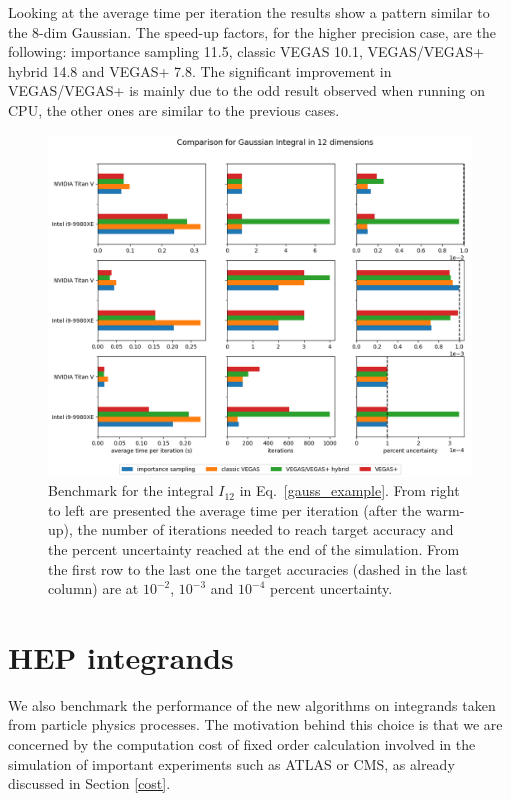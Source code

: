 \documentclass[../main/main.tex]{subfiles}
\begin{document}
Looking at the average time per iteration the results show a pattern similar to the 8-dim Gaussian. The speed-up factors, for the higher precision case, are the following: importance sampling 11.5, classic VEGAS 10.1, VEGAS/VEGAS+ hybrid 14.8 and VEGAS+ 7.8.
The significant improvement in VEGAS/VEGAS+ is mainly due to the odd result observed when running on CPU, the other ones are similar to the previous cases.

\begin{figure}
	\centering
	\includegraphics[width=\textwidth]{../images/gauss12d_final.png}
	\caption{Benchmark  for the integral $I_{12}$ in Eq.~\ref{gauss_example}. From right to left are presented the average time per iteration (after the warm-up), the number of iterations needed to reach target accuracy and the percent uncertainty reached at the end of the simulation. From the first row to the last one the target accuracies (dashed in the last column) are at $10^{-2}$, $10^{-3}$ and $10^{-4}$ percent uncertainty.}
	\label{gauss12d}
\end{figure}


\section{HEP integrands}
We also benchmark the performance of the new algorithms on integrands taken from particle physics processes.
The motivation behind this choice is that we are concerned by the computation cost of fixed order calculation involved in the simulation
of important experiments such as ATLAS or CMS, as already discussed in Section \ref{cost}.
\end{document}
